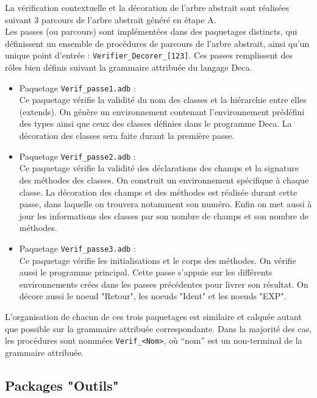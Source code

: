 La vérification contextuelle et la décoration de l'arbre abstrait sont réalisées suivant 3 parcours de l'arbre abstrait généré en étape A. \\
Les passes (ou parcours) sont implémentées dans des paquetages distincts, qui définissent un ensemble de procédures de parcours de l'arbre abstrait, ainsi qu'un unique point d'entrée : \verb!Verifier_Decorer_[123]!.
Ces passes remplissent des rôles bien définis suivant la grammaire attribuée du langage Deca.
\begin{itemize}
\item Paquetage \verb!Verif_passe1.adb! : \\Ce paquetage vérifie la validité du nom des classes et la hiérarchie entre elles (extends). On génère un environnement contenant l'environnement prédéfini des types ainsi que ceux des classes définies dans le programme Deca. La décoration des classes sera faite durant la première passe.
\item Paquetage \verb!Verif_passe2.adb! : \\Ce paquetage vérifie la validité des déclarations des champs et la signature des méthodes des classes. On construit un environnement spécifique à chaque classe. La décoration des champs et des méthodes est réalisée durant cette passe, dans laquelle on trouvera notamment son numéro. Enfin on met aussi à jour les informations des classes par son nombre de champs et son nombre de méthodes.
\item Paquetage \verb!Verif_passe3.adb! : \\Ce paquetage vérifie les initialisations et le corps des méthodes. On vérifie aussi le programme principal. Cette passe s'appuie sur les différents environnements crées dans les passes précédentes pour livrer son résultat. On décore aussi le noeud "Retour", les noeuds "Ident" et les noeuds "EXP".
\end{itemize}

L'organisation de chacun de ces trois paquetages est similaire et calquée autant que possible sur la grammaire attribuée correspondante. Dans la majorité des cas,
les procédures sont nommées \verb!Verif_<Nom>!, où ``nom'' est un non-terminal de la grammaire attribuée.


\subsection{Packages "Outils"}

